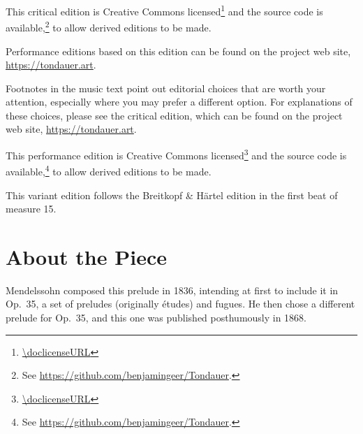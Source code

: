 \documentclass[a4paper, 12pt]{book}
\begin{document}
\ifdef{\critical}
  {%
    This critical edition is Creative Commons
    licensed\footnote{\url{\doclicenseURL}} and the source code is
    available,\footnote{See
      \url{https://github.com/benjamingeer/Tondauer}.} to allow
    derived editions to be made.

    Performance editions based on this edition can be found on
    the project web site, \url{https://tondauer.art}.
  }{%
    Footnotes in the music text point out editorial choices that are
    worth your attention, especially where you may prefer a different
    option. For explanations of these choices, please see the critical
    edition, which can be found on the project web site,
    \url{https://tondauer.art}.

    This performance edition is Creative Commons
    licensed\footnote{\url{\doclicenseURL}} and the source code is
    available,\footnote{See
      \url{https://github.com/benjamingeer/Tondauer}.} to allow
    derived editions to be made.

  }

  \ifdef{\variant}
    {%
      This variant edition follows the Breitkopf \& Härtel edition in
      the first beat of measure 15.
    }{}

\section*{About the Piece}

Mendelssohn composed this prelude in 1836, intending at first to
include it in Op.\ 35, a set of preludes (originally études) and
fugues. He then chose a different prelude for Op.\ 35, and this one
was published posthumously in 1868.\autocite[188--198]{todd_2008}
\end{document}
